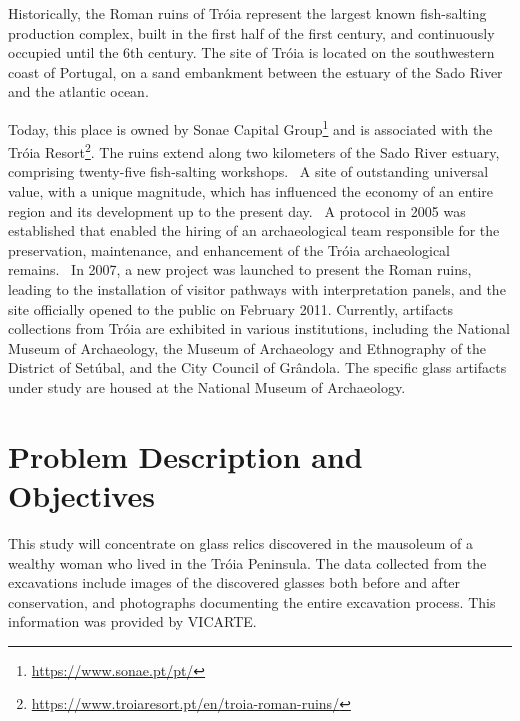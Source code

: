 Historically, the Roman ruins of Tróia represent the largest known fish-salting production complex, built in the first half of the first century, and continuously occupied until the 6th century. 
The site of Tróia is located on the southwestern coast of Portugal, on a sand embankment between the estuary of the Sado River and the atlantic ocean.~\cite{pinto2018reassessment} 

Today, this place is owned by Sonae Capital Group\footnote{\url{https://www.sonae.pt/pt/}} and is associated with the Tróia Resort\footnote{\url{https://www.troiaresort.pt/en/troia-roman-ruins/}}.
The ruins extend along two kilometers of the Sado River estuary, comprising twenty-five fish-salting workshops.~\cite{hocquet2015fish}
A site of outstanding  universal value, with a unique magnitude, which has influenced the economy of an entire region and its development up to the present day.~\cite{unesco_troia} 
A protocol in 2005 was established that enabled the hiring of an archaeological team responsible for the preservation, maintenance, and enhancement of the Tróia archaeological remains.~\cite{pinto2014ruinas} In 2007,
a new project was launched to present the Roman ruins, leading to the installation of visitor pathways with interpretation panels, and the site officially opened to the public on February 2011. 
Currently, artifacts collections from Tróia are exhibited in various institutions, including the National Museum of Archaeology, the Museum of Archaeology and Ethnography of the District of Setúbal, and the City Council of Grândola. The specific glass artifacts under study are housed at the National Museum of Archaeology.




\section{Problem Description and Objectives}
\label{sec:problem_description_and_objectives} 
This study will concentrate on glass relics discovered in the mausoleum of a wealthy woman who lived in the Tróia Peninsula. The data collected from the excavations include 
images of the discovered glasses both before and after conservation, and photographs documenting the entire excavation process. 
This information was provided by \gls{VICARTE}.

